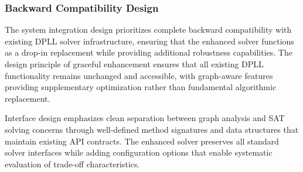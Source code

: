 \subsubsection{Backward Compatibility Design}

The system integration design prioritizes complete backward compatibility with existing DPLL solver infrastructure, ensuring that the enhanced solver functions as a drop-in replacement while providing additional robustness capabilities. The design principle of graceful enhancement ensures that all existing DPLL functionality remains unchanged and accessible, with graph-aware features providing supplementary optimization rather than fundamental algorithmic replacement.

Interface design emphasizes clean separation between graph analysis and SAT solving concerns through well-defined method signatures and data structures that maintain existing API contracts. The enhanced solver preserves all standard solver interfaces while adding configuration options that enable systematic evaluation of trade-off characteristics.

